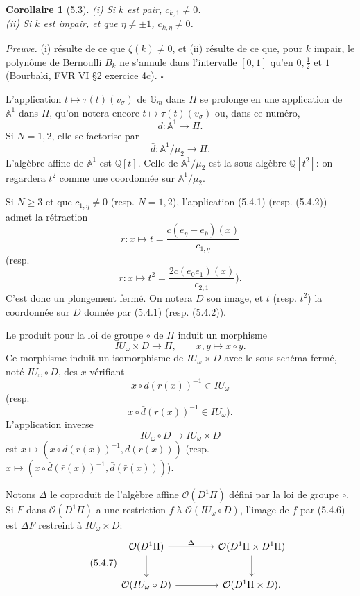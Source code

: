 \documentclass[10pt,a4paper]{article}
\newcommand{\Gm}{\mathbb G_m}
\newcommand{\Q}{\mathbb Q}
\newcommand{\A}{\mathbb A}
\newcommand{\OO}{\mathcal O}
\theoremstyle{deligne}
\newtheorem*{corollary*}{Corollaire}
\newenvironment{proofdel}{\textit{Preuve.}}{\hfill$\square$}
\newcommand{\heading}[1]{\vspace{0.65em}\noindent{\bfseries #1}\quad}
\begin{document}
\begin{corollary*}[5.3]
(i) Si \(k\) est pair, \(c_{k,1}\ne0\).\\
(ii) Si \(k\) est impair, et que \(\eta\ne\pm1\), \(c_{k,\eta}\ne0\).
\end{corollary*}

\begin{proofdel}
(i) résulte de ce que \(\zeta(k)\ne0\), et (ii) résulte de ce que, pour \(k\) impair, le polynôme de Bernoulli \(B_k\) ne s'annule dans l'intervalle \([0,1]\) qu'en \(0,\frac12\) et \(1\) (Bourbaki, FVR VI \S2 exercice 4c).
\end{proofdel}

\heading{5.4.} L'application \(t\mapsto\tau(t)(v_\sigma)\) de \(\Gm\) dans \(\Pi\) se prolonge en une application de \(\A^1\) dans \(\Pi\), qu'on notera encore \(t\mapsto\tau(t)(v_\sigma)\) ou, dans ce numéro,
\[
\tag{5.4.1}
d:\A^1\longrightarrow\Pi.
\]
Si \(N=1,2\), elle se factorise par
\[
\tag{5.4.2}
\bar d:\A^1/\mu_2\longrightarrow\Pi.
\]
L'algèbre affine de \(\A^1\) est \(\Q[t]\). Celle de \(\A^1/\mu_2\) est la sous-algèbre \(\Q[t^2]\): on regardera \(t^2\) comme une coordonnée sur \(\A^1/\mu_2\).

Si \(N\ge3\) et que \(c_{1,\eta}\ne0\) (resp. \(N=1,2\)), l'application (5.4.1) (resp. (5.4.2)) admet la rétraction
\[
r:x\longmapsto t=\frac{c(e_\eta-e_{\bar\eta})(x)}{c_{1,\eta}}
\]
(resp.
\[
\tag{5.4.3}
\bar r:x\longmapsto t^2=\frac{2c(e_0e_1)(x)}{c_{2,1}}).
\]
C'est donc un plongement fermé. On notera \(D\) son image, et \(t\) (resp. \(t^2\)) la coordonnée sur \(D\) donnée par (5.4.1) (resp. (5.4.2)).

Le produit pour la loi de groupe \(\circ\) de \(\Pi\) induit un morphisme
\[
\tag{5.4.4}
IU_\omega\times D\longrightarrow\Pi,\qquad x,y\longmapsto x\circ y.
\]
Ce morphisme induit un isomorphisme de \(IU_\omega\times D\) avec le sous-schéma fermé, noté \(IU_\omega\circ D\), des \(x\) vérifiant
\[
x\circ d(r(x))^{-1}\in IU_\omega
\]
(resp.
\[
\tag{5.4.5}
x\circ\bar d(\bar r(x))^{-1}\in IU_\omega).
\]
L'application inverse
\[
\tag{5.4.6}
IU_\omega\circ D\longrightarrow IU_\omega\times D
\]
est \(x\mapsto(x\circ d(r(x))^{-1},d(r(x)))\) (resp. \(x\mapsto(x\circ\bar d(\bar r(x))^{-1},\bar d(\bar r(x)))\)).

Notons \(\Delta\) le coproduit de l'algèbre affine \(\OO(D^1\Pi)\) défini par la loi de groupe \(\circ\). Si \(F\) dans \(\OO(D^1\Pi)\) a une restriction \(f\) à \(\OO(IU_\omega\circ D)\), l'image de \(f\) par (5.4.6) est \(\Delta F\) restreint à \(IU_\omega\times D\):
\[
\tag{5.4.7}
\begin{tikzcd}[column sep=4.0em,row sep=2.2em]
\OO(D^1\Pi) \arrow[r,"\Delta"] \arrow[d] &
\OO(D^1\Pi\times D^1\Pi) \arrow[d]\\
\OO(IU_\omega\circ D) \arrow[r] &
\OO(D^1\Pi\times D).
\end{tikzcd}
\]
\end{document}
